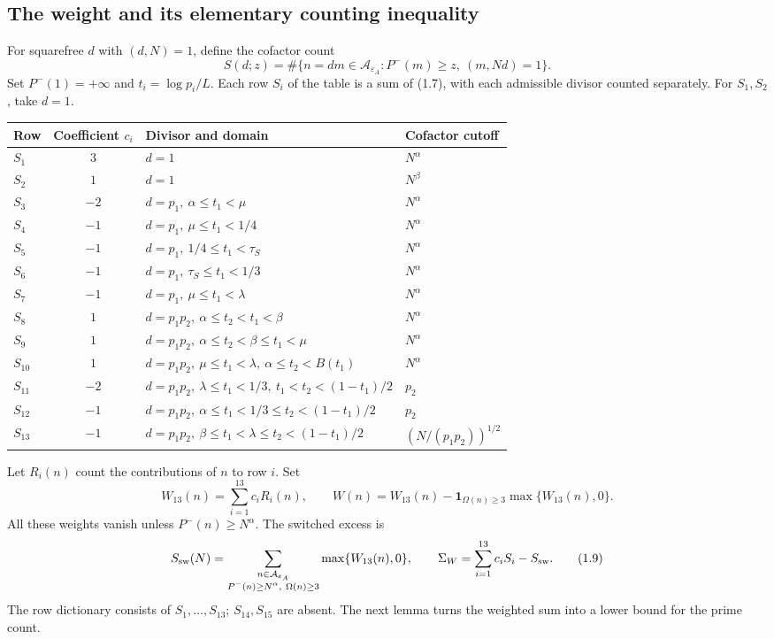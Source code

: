 \subsection{The weight and its elementary counting inequality}

For squarefree $d$ with $(d,N)=1$, define the cofactor count
\[
 S(d;z)=\#\{n=dm\in\mathcal A_{\varepsilon_A}:
             P^-(m)\ge z,\ (m,Nd)=1\}.                    \tag{1.7}
\]
Set $P^-(1)=+\infty$ and $t_i=\log p_i/L$.
Each row $S_i$ of the table is a sum of (1.7),
with each admissible divisor counted separately.
For $S_1,S_2$, take $d=1$.

\begin{center}
\small\renewcommand{\arraystretch}{1.15}\setlength{\tabcolsep}{3pt}
\begin{tabular}{@{}lc p{}l@{}}
\toprule
Row & Coefficient $c_i$ & Divisor and domain & Cofactor cutoff \\
\midrule
$S_1$ & $3$ & $d=1$ & $N^\alpha$ \\
$S_2$ & $1$ & $d=1$ & $N^\beta$ \\
$S_3$ & $-2$ & $d=p_1,\ \alpha\le t_1<\mu$ & $N^\alpha$ \\
$S_4$ & $-1$ & $d=p_1,\ \mu\le t_1<1/4$ & $N^\alpha$ \\
$S_5$ & $-1$ & $d=p_1,\ 1/4\le t_1<\tau_S$ & $N^\alpha$ \\
$S_6$ & $-1$ & $d=p_1,\ \tau_S\le t_1<1/3$ & $N^\alpha$ \\
$S_7$ & $-1$ & $d=p_1,\ \mu\le t_1<\lambda$ & $N^\alpha$ \\
$S_8$ & $1$ & $d=p_1p_2,\ \alpha\le t_2<t_1<\beta$ & $N^\alpha$ \\
$S_9$ & $1$ & $d=p_1p_2,\ \alpha\le t_2<\beta\le t_1<\mu$ & $N^\alpha$ \\
$S_{10}$ & $1$ & $d=p_1p_2,\ \mu\le t_1<\lambda,\ \alpha\le t_2<B(t_1)$ & $N^\alpha$ \\
$S_{11}$ & $-2$ & $d=p_1p_2,\ \lambda\le t_1<1/3,\ t_1<t_2<(1-t_1)/2$ & $p_2$ \\
$S_{12}$ & $-1$ & $d=p_1p_2,\ \alpha\le t_1<1/3\le t_2<(1-t_1)/2$ & $p_2$ \\
$S_{13}$ & $-1$ & $d=p_1p_2,\ \beta\le t_1<\lambda\le t_2<(1-t_1)/2$ & $(N/(p_1p_2))^{1/2}$ \\
\bottomrule
\end{tabular}
\end{center}

Let $R_i(n)$ count the contributions of $n$ to row $i$. Set
\[
 W_{13}(n)=\sum_{i=1}^{13}c_iR_i(n),\qquad
 W(n)=W_{13}(n)-\mathbf1_{\Omega(n)\ge3}\max\{W_{13}(n),0\}.
                                                               \tag{1.8}
\]
All these weights vanish unless $P^-(n)\ge N^\alpha$. The switched excess is
\[
 S_{\rm sw}(N)=\sum_{\substack{n\in\mathcal A_{\varepsilon_A}\\
                  P^-(n)\ge N^\alpha,\ \Omega(n)\ge3}}
                         \max\{W_{13}(n),0\},
 \qquad \Sigma_W=\sum_{i=1}^{13}c_iS_i-S_{\rm sw}.           \tag{1.9}
\]
The row dictionary consists of $S_1,\ldots,S_{13}$; $S_{14},S_{15}$ are absent.
The next lemma turns the weighted sum into a lower bound for the prime count.

